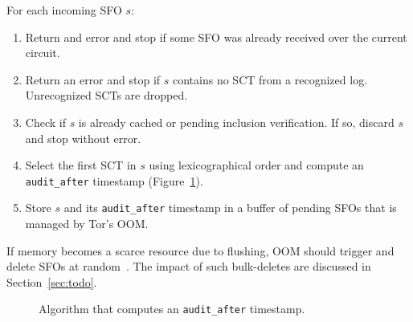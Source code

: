 For each incoming SFO $s$:
\begin{enumerate}
	\item\label{enm:ctr-api:incoming} Return and error and stop if some SFO was
		already received over the current circuit.
	\item\label{enm:ctr-api:well-formed} Return an error and stop if $s$
		contains no SCT from a recognized log.  Unrecognized SCTs are dropped.
	\item\label{enm:ctr-api:cached} Check if $s$ is already cached or pending
		inclusion verification.  If so, discard $s$ and stop without error.
	\item\label{enm:ctr-api:audit-after} Select the first SCT in $s$ using
		lexicographical order and compute an \texttt{audit\_after} timestamp
		(Figure~\ref{fig:audit-after}).
	\item\label{enm:ctr-api:store} Store $s$ and its \texttt{audit\_after}
		timestamp in a buffer of pending SFOs that is managed by Tor's OOM.
\end{enumerate}

If memory becomes a scarce resource due to flushing, OOM should trigger and
delete SFOs at random~\cite{nordberg}.  The impact of such bulk-deletes
are discussed in Section~\ref{sec:todo}.

\begin{figure}
	\centering
	\caption{%
		Algorithm that computes an \texttt{audit\_after} timestamp.
	}
	\label{fig:audit-after}
\end{figure}


